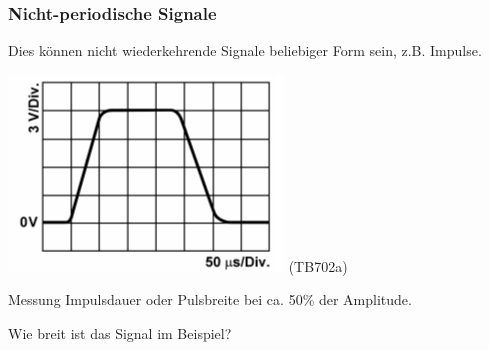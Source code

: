 \begin{frame}
    \frametitle{Nicht-periodische Signale}

    Dies können nicht wiederkehrende Signale beliebiger Form sein, z.B. Impulse.

    \begin{center}
        \includegraphics[width=\textwidth,height=0.5\textheight,keepaspectratio]{a11/TB702a.png}
        \tiny (TB702a)
    \end{center}

    Messung Impulsdauer oder Pulsbreite bei ca. 50\% der Amplitude.
    
    Wie breit ist das Signal im Beispiel?

\end{frame}

